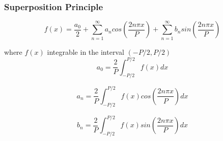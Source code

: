 \documentclass[]{beamer}
\begin{document}

\begin{frame}
\frametitle{Superposition Principle}



\begin{equation}
f(x)=\frac{a_0}{2}+\sum^{\infty}_{n=1} a_n cos\left(\frac{2n\pi x}{P}\right)+\sum^{\infty}_{n=1} b_n sin\left(\frac{2n\pi x}{P}\right)
\end{equation}

\pause


where $f(x)$  integrable  in the interval $(-P/2,P/2)$ 
\begin{equation}
  a_0=\frac{2}{P}\int^{P/2}_{-P/2}f(x)dx
  \end{equation}

  
\begin{equation}
a_n=\frac{2}{P}\int^{P/2}_{-P/2}f(x)cos\left(\frac{2n\pi x}{P}\right)dx
\end{equation}

\begin{equation}
b_n=\frac{2}{P}\int^{P/2}_{-P/2}f(x)sin\left(\frac{2n\pi x}{P}\right)dx
\end{equation}



  \end{frame}





















\end{document}
